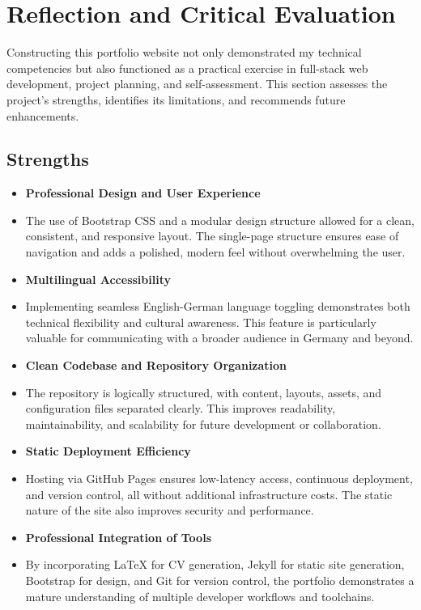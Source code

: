 \chapter{Reflection and Critical Evaluation}
Constructing this portfolio website not only demonstrated my technical competencies but also functioned as a practical exercise in full-stack web development, project planning, and self-assessment. This section assesses the project’s strengths, identifies its limitations, and recommends future enhancements.

\section{Strengths}
\begin{itemize}
	\item \textbf{Professional Design and User Experience}
	\item[ ] The use of Bootstrap CSS and a modular design structure allowed for a clean, consistent, and responsive layout. The single-page structure ensures ease of navigation and adds a polished, modern feel without overwhelming the user.
	\item \textbf{Multilingual Accessibility}
	\item[ ] Implementing seamless English-German language toggling demonstrates both technical flexibility and cultural awareness. This feature is particularly valuable for communicating with a broader audience in Germany and beyond.
	\item \textbf{Clean Codebase and Repository Organization}
	\item[ ] The repository is logically structured, with content, layouts, assets, and configuration files separated clearly. This improves readability, maintainability, and scalability for future development or collaboration.
	\item \textbf{Static Deployment Efficiency}
	\item[ ] Hosting via GitHub Pages ensures low-latency access, continuous deployment, and version control, all without additional infrastructure costs. The static nature of the site also improves security and performance.
	\item \textbf{Professional Integration of Tools}
	\item[ ] By incorporating LaTeX for CV generation, Jekyll for static site generation, Bootstrap for design, and Git for version control, the portfolio demonstrates a mature understanding of multiple developer workflows and toolchains.
\end{itemize}

